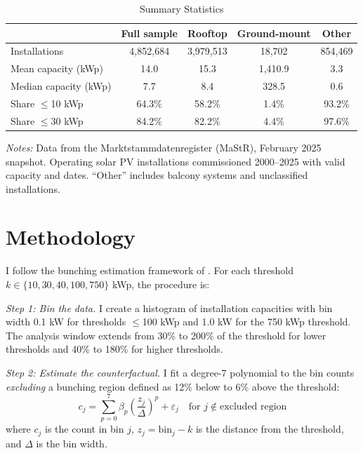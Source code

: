 \documentclass[12pt]{article}
\begin{document}
\begin{table}[t]
\centering
\caption{Summary Statistics}
\label{tab:summary}
\begin{threeparttable}
\begin{tabular}{lcccc}
\toprule
 & Full sample & Rooftop & Ground-mount & Other \\
\midrule
Installations & 4,852,684 & 3,979,513 & 18,702 & 854,469 \\
Mean capacity (kWp) & 14.0 & 15.3 & 1,410.9 & 3.3 \\
Median capacity (kWp) & 7.7 & 8.4 & 328.5 & 0.6 \\
Share $\leq$10 kWp & 64.3\% & 58.2\% & 1.4\% & 93.2\% \\
Share $\leq$30 kWp & 84.2\% & 82.2\% & 4.4\% & 97.6\% \\
\bottomrule
\end{tabular}
\begin{tablenotes}[flushleft]\footnotesize
\item \textit{Notes:} Data from the Marktstammdatenregister (MaStR), February 2025 snapshot. Operating solar PV installations commissioned 2000--2025 with valid capacity and dates. ``Other'' includes balcony systems and unclassified installations.
\end{tablenotes}
\end{threeparttable}
\end{table}


\section{Methodology}
\label{sec:method}

I follow the bunching estimation framework of \citet{Kleven2016}. For each threshold $k \in \{10, 30, 40, 100, 750\}$ kWp, the procedure is:

\textit{Step 1: Bin the data.} I create a histogram of installation capacities with bin width 0.1 kW for thresholds $\leq$100 kWp and 1.0 kW for the 750 kWp threshold. The analysis window extends from 30\% to 200\% of the threshold for lower thresholds and 40\% to 180\% for higher thresholds.

\textit{Step 2: Estimate the counterfactual.} I fit a degree-7 polynomial to the bin counts \textit{excluding} a bunching region defined as 12\% below to 6\% above the threshold:
\begin{equation}
c_j = \sum_{p=0}^{7} \beta_p \left(\frac{z_j}{\Delta}\right)^p + \varepsilon_j \quad \text{for } j \notin \text{excluded region}
\end{equation}
where $c_j$ is the count in bin $j$, $z_j = \text{bin}_j - k$ is the distance from the threshold, and $\Delta$ is the bin width.
\end{document}
